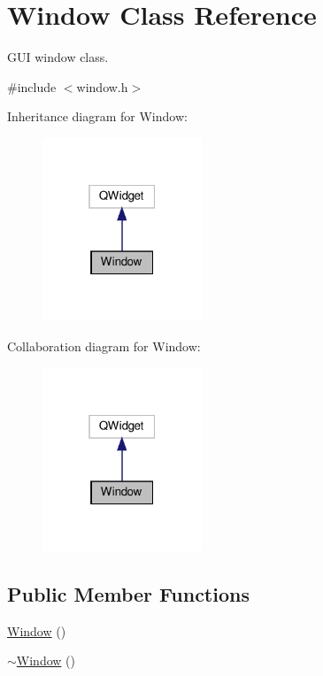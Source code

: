 \hypertarget{classWindow}{}\section{Window Class Reference}
\label{classWindow}


G\+UI window class.  




{\ttfamily \#include $<$window.\+h$>$}



Inheritance diagram for Window\+:
\nopagebreak
\begin{figure}[H]
\begin{center}
\leavevmode
\includegraphics[width=135pt]{classWindow__inherit__graph}
\end{center}
\end{figure}


Collaboration diagram for Window\+:
\nopagebreak
\begin{figure}[H]
\begin{center}
\leavevmode
\includegraphics[width=135pt]{classWindow__coll__graph}
\end{center}
\end{figure}
\subsection*{Public Member Functions}
\begin{DoxyCompactItemize}
\item 
\hyperlink{classWindow_a74e6087da23d3c24e9fac0245e5ec92c}{Window} ()
\item 
\hyperlink{classWindow_a245d821e6016fa1f6970ccbbedd635f6}{$\sim$\+Window} ()
\end{DoxyCompactItemize}


